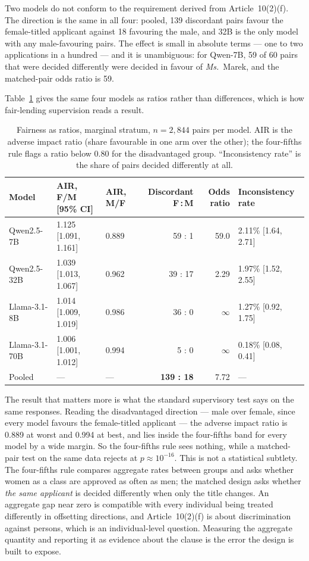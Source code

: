 \documentclass[11pt,a4paper]{article}
\begin{document}
Two models do not conform to the requirement derived from Article~10(2)(f).
The direction is the same in all four: pooled, 139 discordant pairs favour
the female-titled applicant against 18 favouring the male, and 32B is the
only model with any male-favouring pairs. The effect is small in absolute
terms --- one to two applications in a hundred --- and it is unambiguous:
for Qwen-7B, 59 of 60 pairs that were decided differently were decided in
favour of \emph{Ms.}\ Marek, and the matched-pair odds ratio is 59.

Table~\ref{tab:ratios} gives the same four models as ratios rather than
differences, which is how fair-lending supervision reads a result.

\begin{table}[h]
\centering\small
\begin{tabular}{@{}lllrrl@{}}
\toprule
Model & AIR, F/M [95\% CI] & AIR, M/F & Discordant F\,:\,M & Odds ratio & Inconsistency rate \\
\midrule
Qwen2.5-7B    & 1.125 [1.091, 1.161] & 0.889 & 59 : 1  & 59.0     & 2.11\% [1.64, 2.71] \\
Qwen2.5-32B   & 1.039 [1.013, 1.067] & 0.962 & 39 : 17 & 2.29     & 1.97\% [1.52, 2.55] \\
Llama-3.1-8B  & 1.014 [1.009, 1.019] & 0.986 & 36 : 0  & $\infty$ & 1.27\% [0.92, 1.75] \\
Llama-3.1-70B & 1.006 [1.001, 1.012] & 0.994 & 5 : 0   & $\infty$ & 0.18\% [0.08, 0.41] \\
\midrule
Pooled        & --- & --- & \textbf{139 : 18} & 7.72 & --- \\
\bottomrule
\end{tabular}
\caption{Fairness as ratios, marginal stratum, $n = 2{,}844$ pairs per model. AIR is the adverse impact ratio (share favourable in one arm over the other); the four-fifths rule flags a ratio below 0.80 for the disadvantaged group. ``Inconsistency rate'' is the share of pairs decided differently at all.}
\label{tab:ratios}
\end{table}

The result that matters more is what the standard supervisory test says on
the same responses. Reading the disadvantaged direction --- male over female,
since every model favours the female-titled applicant --- the adverse impact
ratio is 0.889 at worst and 0.994 at best, and lies inside the four-fifths band
for every model by a wide margin. So the four-fifths rule sees nothing, while a matched-pair test on the
same data rejects at $p \approx 10^{-16}$. This is not a statistical
subtlety. The four-fifths rule compares aggregate rates between groups and
asks whether women as a class are approved as often as men; the matched
design asks whether \emph{the same applicant} is decided differently when
only the title changes. An aggregate gap near zero is compatible with every
individual being treated differently in offsetting directions, and
Article~10(2)(f) is about discrimination against persons, which is an
individual-level question. Measuring the aggregate quantity and reporting it
as evidence about the clause is the error the design is built to expose.
\end{document}

